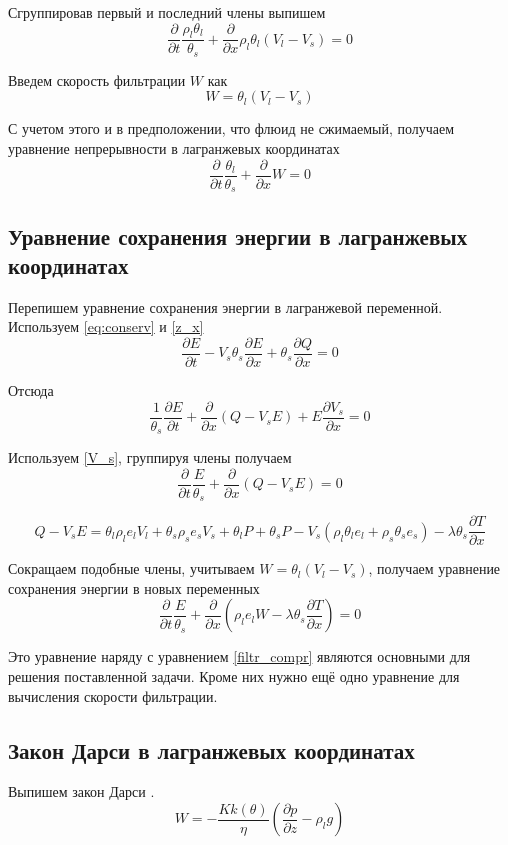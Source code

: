 \documentclass[12pt,a4paper]{article}
\newcommand{\pd}[2]{\frac{\partial #1}{\partial #2}}
\begin{document}
Сгруппировав первый и последний члены выпишем
\begin{equation}
\pd{}{t}\frac{\rho_l\theta_l}{\theta_s} + \pd{}{x}\rho_l\theta_l(V_l - V_s) = 0
\label{filtr_compr_1}
\end{equation}

Введем скорость фильтрации $W$ как
\begin{equation}
W = \theta_l (V_l - V_s )
\label{W_filtr}
\end{equation}

С учетом этого и в предположении, что флюид не сжимаемый, получаем уравнение непрерывности в лагранжевых координатах
\begin{equation}
\pd{}{t}\frac{\theta_l}{\theta_s} + \pd{}{x}W = 0
\label{filtr_compr}
\end{equation}

\subsection{Уравнение сохранения энергии в лагранжевых координатах}
Перепишем уравнение сохранения энергии в лагранжевой переменной. Используем \eqref{eq:conserv} и \eqref{z_x}
$$
\pd{E}{t} - V_s\theta_s\pd{E}{x} + \theta_s\pd{Q}{x} = 0
$$

Отсюда
$$
\frac{1}{\theta_s}\pd{E}{t} + \pd{}{x}(Q-V_s E) + E\pd{V_s}{x} = 0
$$

Используем \eqref{V_s}, группируя члены получаем
\begin{equation}
\pd{}{t}\frac{E}{\theta_s} + \pd{}{x}(Q - V_s E) = 0
\end{equation}

$$
Q-V_s E = \theta_l\rho_l e_l V_l + \theta_s\rho_s e_s V_s + \theta_l P + \theta_s P -V_s(\rho_l\theta_l e_l +\rho_s\theta_s e_s) - \lambda\theta_s\pd{T}{x}
$$

Сокращаем подобные члены, учитываем $W = \theta_l (V_l - V_s )$, получаем уравнение сохранения энергии в новых переменных
\begin{equation}
\pd{}{t}\frac{E}{\theta_s} + \pd{}{x}(\rho_l e_l W - \lambda\theta_s\pd{T}{x}) = 0
\label{eq:conserv_new}
\end{equation}

Это уравнение наряду с уравнением \eqref{filtr_compr} являются основными для решения поставленной задачи. Кроме них нужно ещё одно уравнение для вычисления скорости фильтрации. 

\subsection{Закон Дарси в лагранжевых координатах}
Выпишем закон Дарси \cite{Kond_mech_2007}.
\begin{equation}
W= -\frac{K k(\theta)}{\eta}\left(\pd{p}{z} - \rho_l g \right)
\label{Darsi}
\end{equation}
\end{document}
